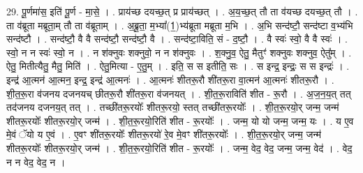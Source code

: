\documentclass[17pt]{extarticle}
\begin{document}
29. पू॒र्णमा॑स॒ इति॑ पू॒र्ण - मा॒से॒ । . प्राय॑च्छ दयच्छ॒त् प्र प्राय॑च्छत् । . अ॒य॒च्छ॒त् तौ ता व॑यच्छ दयच्छ॒त् तौ । . ता व॑ब्रूता मब्रूता॒म् तौ ता व॑ब्रूताम् । . अ॒ब्रू॒ता॒ म॒भ्या᳚(1॒)भ्य॑ब्रूता मब्रूता म॒भि । . अ॒भि सन्द॑ष्टौ॒ सन्द॑ष्टा व॒भ्य॑भि सन्द॑ष्टौ । . सन्द॑ष्टौ॒ वै वै सन्द॑ष्टौ॒ सन्द॑ष्टौ॒ वै । . सन्द॑ष्टा॒विति॒ सं - द॒ष्टौ॒ । . वै स्वः॑ स्वो॒ वै वै स्वः॑ । . स्वो॒ न न स्वः॑ स्वो॒ न । . न श॑क्नुवः शक्नुवो॒ न न श॑क्नुवः । . श॒क्नु॒व॒ ऐतु॒ मैतुꣳ॑ शक्नुवः शक्नुव॒ ऐतु᳚म् । . ऐतु॒ मितीत्यैतु॒ मैतु॒ मिति॑ । . ऐतु॒मित्या - ए॒तु॒म् । . इति॒ स स इतीति॒ सः । . स इन्द्र॒ इन्द्रः॒ स स इन्द्रः॑ । . इन्द्र॑ आ॒त्मन॑ आ॒त्मन॒ इन्द्र॒ इन्द्र॑ आ॒त्मनः॑ । . आ॒त्मनः॑ शीतरू॒रौ शी॑तरू॒रा वा॒त्मन॑ आ॒त्मनः॑ शीतरू॒रौ । . शी॒त॒रू॒रा व॑जनय दजनयच् छीतरू॒रौ शी॑तरू॒रा व॑जनयत् । . शी॒त॒रू॒राविति॑ शीत - रू॒रौ । . अ॒ज॒न॒य॒त् तत् तद॑जनय दजनय॒त् तत् । . तच्छी॑तरू॒रयोः᳚ शीतरू॒रयो॒ स्तत् तच्छी॑तरू॒रयोः᳚ । . शी॒त॒रू॒रयो॒र् जन्म॒ जन्म॑ शीतरू॒रयोः᳚ शीतरू॒रयो॒र् जन्म॑ । . शी॒त॒रू॒रयो॒रिति॑ शीत - रू॒रयोः᳚ । . जन्म॒ यो यो जन्म॒ जन्म॒ यः । . य ए॒व मे॒वं ॅयो य ए॒वं । . ए॒वꣳ शी॑तरू॒रयोः᳚ शीतरू॒रयो॑ रे॒व मे॒वꣳ शी॑तरू॒रयोः᳚ । . शी॒त॒रू॒रयो॒र् जन्म॒ जन्म॑ शीतरू॒रयोः᳚ शीतरू॒रयो॒र् जन्म॑ । . शी॒त॒रू॒रयो॒रिति॑ शीत - रू॒रयोः᳚ । . जन्म॒ वेद॒ वेद॒ जन्म॒ जन्म॒ वेद॑ । . वेद॒ न न वेद॒ वेद॒ न । \newline
\end{document}
